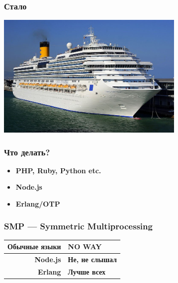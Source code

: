 \documentclass[14pt]{beamer}
\begin{document}
\begin{frame}
  \frametitle{Стало}
      \hfil
      \includegraphics[height=6cm]{costa_concordia.jpg}
      \hfil
\end{frame}

\begin{frame}
  \frametitle{Что делать?}
  \begin{itemize}
    \pause
  \item \textbf{\color{darkgray}PHP, Ruby, Python etc.}
  \item \textbf{\color{darkgray}Node.js}
  \item \textbf{\color{darkgray}Erlang/OTP}
  \end{itemize}
\end{frame}

\begin{frame}
  \frametitle{SMP — Symmetric Multiprocessing}
  \begin{center}
    \begin{tabular}{| r | l |}
      \hline
      \textbf{\color{darkgray}Обычные языки} & \textbf{\color{red}NO WAY} \\ \hline
      \textbf{\color{darkgray}Node.js} & \textbf{\color{red}Не, не слышал} \\ \hline
      \textbf{\color{darkgray}Erlang} & \textbf{\color{darkgreen}Лучше всех} \\
      \hline
    \end{tabular}
  \end{center}
\end{frame}
\end{document}
